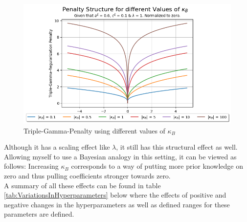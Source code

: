 \documentclass[12pt,a4paper]{article}
\begin{document}
\begin{figure}[h!]
\centering
\includegraphics[scale=0.75]{../02_simulation/021_simulation_figures/TGPenalty_ChangeInKappa.png}
\caption{Triple-Gamma-Penalty using different values of $\kappa_B$}
\label{fig:TGPenalty_ChangeInKappa}
\end{figure}

Although it has a scaling effect like $\lambda$, it still has this structural effect as well. Allowing myself to use a Bayesian analogy in this setting, it can be viewed as follows: Increasing $\kappa_B$ corresponds to a way of putting more prior knowledge on zero and thus pulling coefficients stronger towards zero.\\

A summary of all these effects can be found in table \ref{tab:VariationsInHyperparameters} below where the effects of positive and negative changes in the hyperparameters as well as defined ranges for these parameters are defined. 
\end{document}
